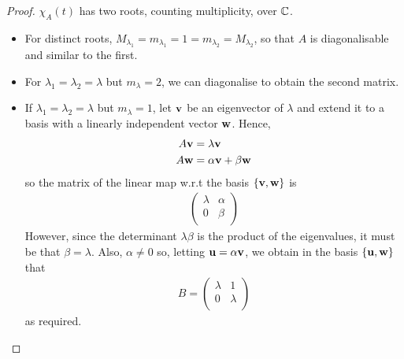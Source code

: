 \documentclass{../../template/note}
\begin{document}
    \begin{proof}
        \(\chi_A(t)\) has two roots, counting multiplicity, over \(\mathbb C\).
        \begin{itemize}
            \item For distinct roots, \(M_{\lambda_1} = m_{\lambda_1} = 1 = m_{\lambda_2} = M_{\lambda_2}\), so that \(A\) is diagonalisable and similar to the first.
            \item For \(\lambda_1 = \lambda_2 = \lambda\) but \(m_\lambda = 2\), we can diagonalise to obtain the second matrix.
            \item If \(\lambda_1 = \lambda_2 = \lambda\) but \(m_\lambda = 1\), let \(\V v\) be an eigenvector of \(\lambda\) and extend it to a basis with a linearly independent vector \(\V w\). Hence,
            \begin{align*}
                A\V v &= \lambda \V v \\
                A \V w &= \alpha \V v + \beta \V w
            \end{align*}
            so the matrix of the linear map w.r.t the basis \(\{\V v, \V w\}\) is
            \begin{align*}
                \begin{pmatrix}
                    \lambda & \alpha \\
                    0 & \beta \\
                \end{pmatrix}
            \end{align*}
            However, since the determinant \(\lambda\beta\) is the product of the eigenvalues, it must be that \(\beta = \lambda\). Also, \(\alpha \neq 0\) so, letting \(\V u = \alpha \V v\), we obtain in the basis \(\{\V u, \V w\}\) that
            \begin{align*}
                B = \begin{pmatrix}
                    \lambda & 1 \\
                    0 & \lambda \\
                \end{pmatrix}
            \end{align*}
            as required.           
        \end{itemize}        
    \end{proof}
    
\end{document}
